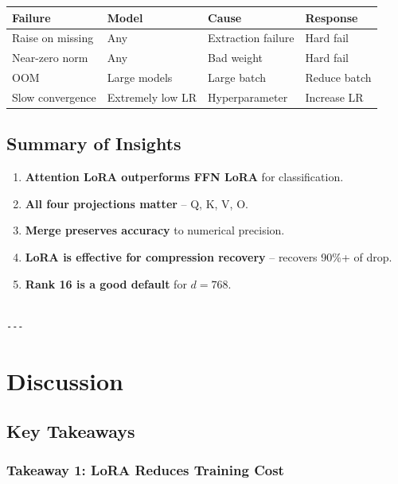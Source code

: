 \begin{table}[H]
\centering
\small
\begin{tabular}{llll}
\toprule
\textbf{Failure} & \textbf{Model} & \textbf{Cause} & \textbf{Response} \\
\midrule
Raise on missing & Any & Extraction failure & Hard fail \\
Near-zero norm & Any & Bad weight & Hard fail \\
OOM & Large models & Large batch & Reduce batch \\
Slow convergence & Extremely low LR & Hyperparameter & Increase LR \\
\bottomrule
\end{tabular}
\end{table}

\subsection{Summary of Insights}

\begin{enumerate}
\item \textbf{Attention LoRA outperforms FFN LoRA} for classification.
\item \textbf{All four projections matter} -- Q, K, V, O.
\item \textbf{Merge preserves accuracy} to numerical precision.
\item \textbf{LoRA is effective for compression recovery} -- recovers 90\%+ of drop.
\item \textbf{Rank 16 is a good default} for $d = 768$.
\end{enumerate}
\begin{lstlisting}

---
\end{lstlisting}

\section{Discussion}

\subsection{Key Takeaways}

\subsubsection{Takeaway 1: LoRA Reduces Training Cost}


